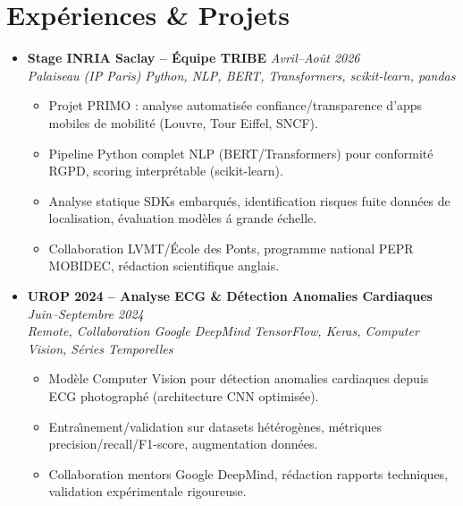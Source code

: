 \documentclass[a4paper,11pt]{article}
\begin{document}
\section{Exp\'eriences \& Projets}
\begin{itemize}[leftmargin=*, label={-}]
    \item \textbf{Stage INRIA Saclay -- \'Equipe TRIBE} \hfill \textit{Avril--Ao\^ut 2026} \\
    \textit{Palaiseau (IP Paris)} \hfill \textit{Python, NLP, BERT, Transformers, scikit-learn, pandas}
    \vspace{-2pt}
        \begin{itemize}[leftmargin=0.4cm, nosep, label=\tiny$\bullet$]
            \item \small{Projet PRIMO : analyse automatisée confiance/transparence d'apps mobiles de mobilité (Louvre, Tour Eiffel, SNCF).}
            \item \small{Pipeline Python complet NLP (BERT/Transformers) pour conformité RGPD, scoring interprétable (scikit-learn).}
            \item \small{Analyse statique SDKs embarqués, identification risques fuite donn\'ees de localisation, \'evaluation mod\`eles \'a grande \'echelle.}
            \item \small{Collaboration LVMT/\'Ecole des Ponts, programme national PEPR MOBIDEC, r\'edaction scientifique anglais.}
        \end{itemize}
    \vspace{3pt}
    \item \textbf{UROP 2024 -- Analyse ECG \& D\'etection Anomalies Cardiaques} \hfill \textit{Juin--Septembre 2024} \\
    \textit{Remote, Collaboration Google DeepMind} \hfill \textit{TensorFlow, Keras, Computer Vision, S\'eries Temporelles}
    \vspace{-2pt}
        \begin{itemize}[leftmargin=0.4cm, nosep, label=\tiny$\bullet$]
            \item \small{Mod\`ele Computer Vision pour d\'etection anomalies cardiaques depuis ECG photograph\'e (architecture CNN optimis\'ee).}
            \item \small{Entra\^{\i}nement/validation sur datasets h\'et\'erog\`enes, m\'etriques precision/recall/F1-score, augmentation donn\'ees.}
            \item \small{Collaboration mentors Google DeepMind, r\'edaction rapports techniques, validation exp\'erimentale rigoureuse.}

\end{itemize}
\end{itemize}
\end{document}
